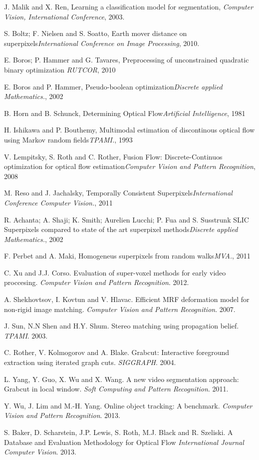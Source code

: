 \begin{thebibliography}{99}

J. Malik and X. Ren, Learning a classification model for segmentation, {\it Computer Vision, International Conference}, 2003.

S. Boltz; F. Nielsen and S. Soatto, Earth mover distance on superpixels{\it International Conference on Image Processing}, 2010.

E. Boros; P. Hammer and G. Tavares, Preprocessing of unconstrained quadratic binary optimization {\it RUTCOR}, 2010

E. Boros and P. Hammer, Pseudo-boolean optimization{\it Discrete applied Mathematics.}, 2002

B. Horn and B. Schunck, Determining Optical Flow{\it Artificial Intelligence}, 1981

H. Ishikawa and P. Bouthemy, Multimodal estimation of discontinous optical flow using Markov random fields{\it TPAMI.}, 1993

V. Lempitsky, S. Roth and C. Rother, Fusion Flow: Discrete-Continuos optimization for optical flow estimation{\it Computer Vision and Pattern Recognition}, 2008

M. Reso and J. Jachalsky, Temporally Consistent Superpixels{\it International Conference Computer Vision.}, 2011

R. Achanta; A. Shaji; K. Smith; Aurelien Lucchi; P. Fua and S. Susstrunk SLIC Superpixels compared to state of the art superpixel methods{\it Discrete applied Mathematics.}, 2002

F. Perbet and A. Maki, Homogeneus superpixels from random walks{\it MVA.}, 2011

C. Xu and J.J. Corso. Evaluation of super-voxel methods for early video proccesing. {\it Computer Vision and Pattern Recognition}. 2012.

A. Shekhovtsov, I. Kovtun and V. Hlavac. Efficient MRF deformation model for non-rigid image matching. {\it Computer Vision and Pattern Recognition}. 2007.

J. Sun, N.N Shen and H.Y. Shum. Stereo matching using propagation belief. {\it TPAMI}. 2003.

C. Rother, V. Kolmogorov and A. Blake. Grabcut: Interactive foreground extraction using iterated graph cuts. {\it SIGGRAPH}. 2004.

L. Yang, Y. Guo, X. Wu and X. Wang. A new video segmentation approach: Grabcut in local window. {\it Soft Computing and Pattern Recognition}. 2011.

Y. Wu, J. Lim and M.-H. Yang. Online object tracking: A benchmark. {\it Computer Vision and Pattern Recognition}. 2013.

S. Baker, D. Scharstein, J.P. Lewis, S. Roth, M.J. Black and R. Szeliski. A Database and Evaluation Methodology for Optical Flow {\it International Journal Computer Vision}. 2013.

\end{thebibliography}